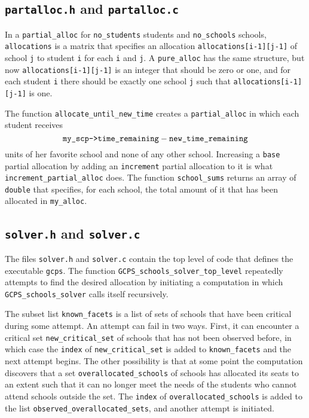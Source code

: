 \documentclass[12pt]{article}
\theoremstyle{definition}
\begin{document}
\begin{appendix}
\subsection{\texttt{partalloc.h} and \texttt{partalloc.c}}

In a \texttt{partial\_alloc} for \texttt{no\_students} students and
\texttt{no\_schools} schools, \texttt{allocations} is a matrix that
specifies an allocation \texttt{allocations[i-1][j-1]} of school
\texttt{j} to student \texttt{i} for each \texttt{i} and \texttt{j}.
A \texttt{pure\_alloc} has the same structure, but now
\texttt{allocations[i-1][j-1]} is an integer that should be zero or
one, and for each student \texttt{i} there should be exactly one
school \texttt{j} such that \texttt{allocations[i-1][j-1]} is one.

The function
\texttt{allocate\_until\_new\_time} creates a \texttt{partial\_alloc}
in which each student receives
$$\text{\texttt{my\_scp->time\_remaining}} -
\text{\texttt{new\_time\_remaining}}$$ units of her favorite school
and none of any other school.  Increasing a \texttt{base} partial
allocation by adding an \texttt{increment} partial allocation to it is
what \texttt{increment\_partial\_alloc} does.  The function
\texttt{school\_sums} returns an array of \texttt{double} that
specifies, for each school, the total amount of it that has been
allocated in \texttt{my\_alloc}.

\subsection{\texttt{solver.h} and \texttt{solver.c}} \label{subsec:Solver}

The files \texttt{solver.h} and \texttt{solver.c} contain the top
level of code that defines the executable \texttt{gcps}.  The function
\texttt{GCPS\_schools\_solver\_top\_level} repeatedly attempts to find
the desired allocation by initiating a computation in which
\texttt{GCPS\_schools\_solver} calls itself recursively.

The subset list \texttt{known\_facets} is a list of sets of schools
that have been critical during some attempt.  An attempt can fail in two
ways.  First, it can encounter a critical set
\texttt{new\_critical\_set} of schools that has not been observed
before, in which case the \texttt{index} of
\texttt{new\_critical\_set} is added to \texttt{known\_facets} and the
next attempt begins.  The other possibility is that at some point the
computation discovers that a set \texttt{overallocated\_schools} of
schools has allocated its seats to an extent such that it can no
longer meet the needs of the students who cannot attend schools
outside the set.  The \texttt{index} of
\texttt{overallocated\_schools} is added to the list
\texttt{observed\_overallocated\_sets}, and another attempt is
initiated.


\end{appendix}
\end{document}
